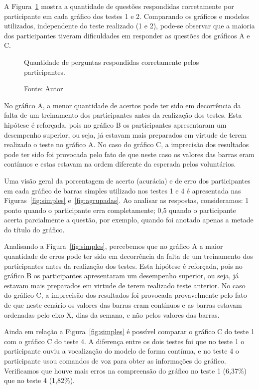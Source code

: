 \documentclass[
	12pt,				%
	openright,			%
	oneside,			%
	a4paper,			%
	english,			%
	brazil				%
	]{abntex2}
\begin{document}
A Figura~\ref{fig:part_sce} mostra a quantidade de questões respondidas corretamente por participante em cada gráfico dos testes 1 e 2. Comparando os gráficos e modelos utilizados, independente do teste realizado (1 e 2), pode-se observar que a maioria dos participantes tiveram dificuldades em responder as questões dos gráficos A e C.

\begin{figure}[!h]
\caption{Quantidade de perguntas respondidas corretamente pelos participantes.}
\caption*{Fonte: Autor}
\label{fig:part_sce}
\end{figure}

No gráfico A, a menor quantidade de acertos pode ter sido em decorrência da falta de um treinamento dos participantes antes da realização dos testes. Esta hipótese é reforçada, pois no gráfico B os participantes apresentaram um desempenho superior, ou seja, já estavam mais preparados em virtude de terem realizado o teste no gráfico A. No caso do gráfico C, a imprecisão dos resultados pode ter sido foi provocada pelo fato de que neste caso os valores das barras eram contínuos e estas estavam na ordem diferente da esperada pelos voluntários.


Uma visão geral da porcentagem de acerto (acurácia) e de erro dos participantes em cada gráfico de barras simples utilizado nos testes 1 e 4 é apresentada nas Figuras~\ref{fig:simples} e~\ref{fig:agrupadas}. Ao analisar as respostas, consideramos: 1 ponto quando o participante erra completamente; 0,5 quando o participante acerta parcialmente a questão, por exemplo, quando foi anotado apenas a metade do título do gráfico.



Analisando a Figura~\ref{fig:simples}, percebemos que no gráfico A a maior quantidade de erros pode ter sido em decorrência da falta de um treinamento dos participantes antes da realização dos testes. Esta hipótese é reforçada, pois no gráfico B os participantes apresentaram um desempenho superior, ou seja, já estavam mais preparados em virtude de terem realizado teste anterior. No caso do gráfico C, a imprecisão dos resultados foi provocada provavelmente pelo fato de que neste cenário os valores das barras eram contínuos e as barras estavam ordenadas pelo eixo X, dias da semana, e não pelos valores das barras.


Ainda em relação a Figura~\ref{fig:simples} é possível comparar o gráfico C do teste 1 com o gráfico C do teste 4. A diferença entre os dois testes foi que no teste 1 o participante ouviu a vocalização do modelo de forma contínua, e no teste 4 o participante usou comandos de voz para obter as informações do gráfico. Verificamos que houve mais erros na compreensão do gráfico no teste 1 (6,37\%) que no teste 4 (1,82\%).
\end{document}
